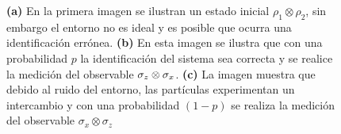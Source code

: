 \begin{figure}[H]

\begin{subfigure}{0.4\textwidth}
  \centering
{}
\hfill
\caption{}
\end{subfigure}
\caption{\textbf{(a)} En la primera imagen se ilustran un estado inicial $\rho_1\otimes \rho_2$, sin embargo el entorno no es ideal y es posible que ocurra una identificación errónea.\textbf{ (b)} En esta imagen se ilustra que con una probabilidad $p$ la identificación del sistema sea correcta y se realice la medición del observable $\sigma_z\otimes \sigma_x$.\textbf{ (c)} La imagen muestra que debido al ruido del entorno, las partículas experimentan un intercambio y con una probabilidad $(1-p)$ se realiza la medición del observable $\sigma_x\otimes \sigma_z$ }\label{diagrama-cajas}
\end{figure}
